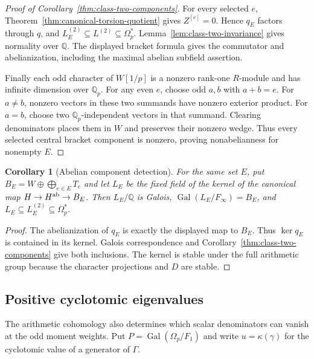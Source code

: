 \documentclass[11pt]{article}
\newtheorem{corollary}[theorem]{Corollary}
\theoremstyle{definition}\newtheorem{definition}[theorem]{Definition}
\begin{document}
\begin{proof}[Proof of Corollary~\ref{thm:class-two-components}]
For every selected $e$, Theorem~\ref{thm:canonical-torsion-quotient}
gives $Z^{[e]}=0$. Hence $q_E$ factors through $q$, and
$L_E^{(2)}\subseteq L^{(2)}\subseteq\Omega_p^*$.
Lemma~\ref{lem:class-two-invariance} gives normality over
$\mathbb Q$. The displayed bracket formula gives the
commutator and abelianization, including the maximal abelian
subfield assertion.

Finally each odd character of $W[1/p]$ is a nonzero rank-one
$R$-module and has infinite dimension over $\mathbb Q_p$.
For any even $e$, choose odd $a,b$ with $a+b=e$.
For $a\ne b$, nonzero vectors in these two summands have
nonzero exterior product.  For $a=b$, choose two
$\mathbb Q_p$-independent vectors in that summand.
Clearing denominators places them in $W$ and preserves their
nonzero wedge.  Thus every selected central bracket
component is nonzero, proving nonabelianness for nonempty $E$.
\end{proof}




\begin{corollary}[Abelian component detection]\label{thm:abelian}
For the same set $E$, put $B_E=W\oplus\bigoplus_{e\in E}T_e$
and let $L_E$ be the fixed field of the kernel of the canonical
map $H\to H^{\rm ab}\to B_E$. Then $L_E/\mathbb Q$ is Galois,
$\operatorname{Gal}(L_E/F_\infty)=B_E$, and
$L_E\subseteq L_E^{(2)}\subseteq\Omega_p^*$.
\end{corollary}
\begin{proof}
The abelianization of $q_E$ is exactly the displayed map to $B_E$.
Thus $\ker q_E$ is contained in its kernel. Galois correspondence
and Corollary~\ref{thm:class-two-components} give both inclusions.
The kernel is stable under the full arithmetic group because the
character projections and $D$ are stable.
\end{proof}

\subsection{Positive cyclotomic eigenvalues}
\label{subsec:positive-eigenvalues}

The arithmetic cohomology also determines which scalar
denominators can vanish at the odd moment weights.
Put $P=\operatorname{Gal}(\Omega_p/F_1)$ and write
$u=\kappa(\gamma)$ for the cyclotomic value of a generator
of $\Gamma$.
\end{document}
